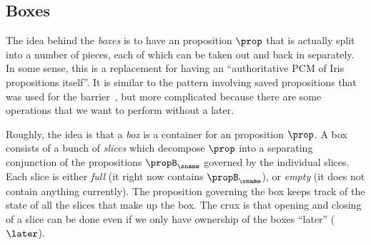 \subsection{Boxes}

The idea behind the \emph{boxes} is to have an proposition $\prop$ that is actually split into a number of pieces, each of which can be taken out and back in separately.
In some sense, this is a replacement for having an ``authoritative PCM of Iris propositions itself''.
It is similar to the pattern involving saved propositions that was used for the barrier~\cite{iris2}, but more complicated because there are some operations that we want to perform without a later.

Roughly, the idea is that a \emph{box} is a container for an proposition $\prop$.
A box consists of a bunch of \emph{slices} which decompose $\prop$ into a separating conjunction of the propositions $\propB_\sname$ governed by the individual slices.
Each slice is either \emph{full} (it right now contains $\propB_\sname$), or \emph{empty} (it does not contain anything currently).
The proposition governing the box keeps track of the state of all the slices that make up the box.
The crux is that opening and closing of a slice can be done even if we only have ownership of the boxes ``later'' ($\later$).

